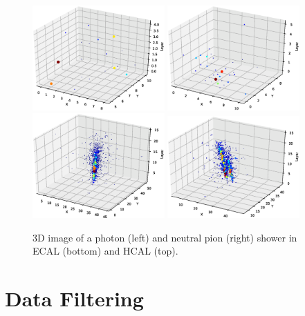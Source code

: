\begin{figure}[htbp]
    \centering
    \includegraphics[width=0.45\textwidth]{Images/Calo/Gamma_HCAL.eps}
    \includegraphics[width=0.45\textwidth]{Images/Calo/Pi0_HCAL.eps} \\
    \includegraphics[width=0.45\textwidth]{Images/Calo/Gamma_ECAL.eps}
    \includegraphics[width=0.45\textwidth]{Images/Calo/Pi0_ECAL.eps}
    \caption{3D image of a photon (left) and neutral pion (right) shower in ECAL (bottom) and HCAL (top).}
    \label{fig:sample}
\end{figure}

\section{Data Filtering}

